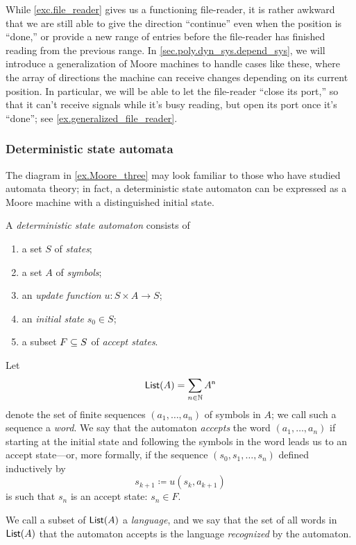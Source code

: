 \documentclass[Book-Poly]{subfiles}
\begin{document}
While \cref{exc.file_reader} gives us a functioning file-reader, it is rather awkward that we are still able to give the direction ``continue'' even when the position is ``done,'' or provide a new range of entries before the file-reader has finished reading from the previous range.
In \cref{sec.poly.dyn_sys.depend_sys}, we will introduce a generalization of Moore machines to handle cases like these, where the array of directions the machine can receive changes depending on its current position.
In particular, we will be able to let the file-reader ``close its port,'' so that it can't receive signals while it's busy reading, but open its port once it's ``done''; see \cref{ex.generalized_file_reader}.

\subsubsection{Deterministic state automata}

The diagram in \cref{ex.Moore_three} may look familiar to those who have studied automata theory; in fact, a deterministic state automaton can be expressed as a Moore machine with a distinguished initial state.

\begin{definition}\label{def.dfa}
A \emph{deterministic state automaton} consists of
\begin{enumerate}
	\item a set $S$ of \emph{states};
	\item a set $A$ of \emph{symbols};
	\item an \emph{update function} $u\colon S\times A\to S$;
	\item an \emph{initial state} $s_0\in S$;
	\item a subset $F\ss S$ of \emph{accept states}.
\end{enumerate}
Let
\[
  \lst(A)=\sum_{n\in\nn}A^\ord{n}
\]
denote the set of finite sequences $(a_1,\ldots,a_n)$ of symbols in $A$; we call such a sequence a \emph{word}.
We say that the automaton \emph{accepts} the word $(a_1,\ldots,a_n)$ if starting at the initial state and following the symbols in the word leads us to an accept state---or, more formally, if the sequence $(s_0,s_1,\ldots,s_n)$ defined inductively by
\[
  s_{k+1}\coloneqq u(s_k,a_{k+1})
\]
is such that $s_n$ is an accept state: $s_n\in F$.

We call a subset of $\lst(A)$ a \emph{language}, and we say that the set of all words in $\lst(A)$ that the automaton accepts is the language \emph{recognized} by the automaton.
\end{definition}
\end{document}
